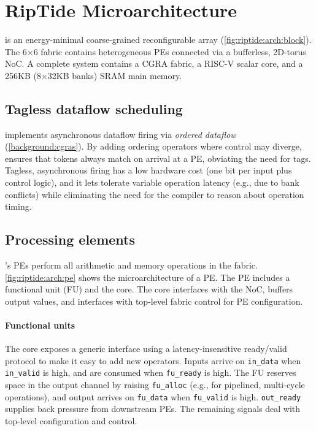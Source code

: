 
\section{RipTide Microarchitecture}
\label{riptide:arch}

\figRipTideArchTop

\riptide is an energy-minimal coarse-grained reconfigurable array (\autoref{fig:riptide:arch:block}).
% 
The 6$\times$6 fabric contains
heterogeneous PEs connected via a bufferless, 2D-torus NoC.
% 
A complete \riptide system contains a CGRA fabric, a RISC-V scalar core, and a 256KB
(8$\times$32KB banks) SRAM main memory.

\subsection{Tagless dataflow scheduling}

\riptide implements asynchronous dataflow firing via \emph{ordered dataflow} (\autoref{background:cgras}).
%
By adding ordering operators where control may diverge,
%
\riptide ensures that tokens always match on arrival at a PE, obviating the need for tags.
%
Tagless, asynchronous firing has a low hardware cost (one bit per input plus
control logic),
%
and it lets \riptide tolerate variable operation latency
(e.g., due to bank conflicts) while eliminating the need for the compiler to reason about
operation timing.

\subsection{Processing elements}
\riptide's PEs perform all arithmetic and memory operations in the fabric.
%
\autoref{fig:riptide:arch:pe} shows the microarchitecture of a PE.
% 
The PE includes a functional unit (FU) and the \textmu core.
% 
The \textmu core interfaces with the NoC, buffers
output values, and interfaces with top-level fabric control for PE configuration.

\paragraph{Functional units}
The \textmu core exposes a generic interface using a
latency-insensitive ready/valid protocol to make it easy to add new
operators.
%
Inputs arrive on {\tt in\_data} when {\tt in\_valid} is high,
and are consumed when {\tt fu\_ready} is high.
%
The FU reserves space in the output channel by raising {\tt fu\_alloc}
(e.g., for pipelined, multi-cycle operations),
and output arrives on {\tt fu\_data} when {\tt fu\_valid} is high.
%
{\tt out\_ready} supplies back pressure from downstream PEs.
%
The remaining signals deal with top-level configuration and control.

